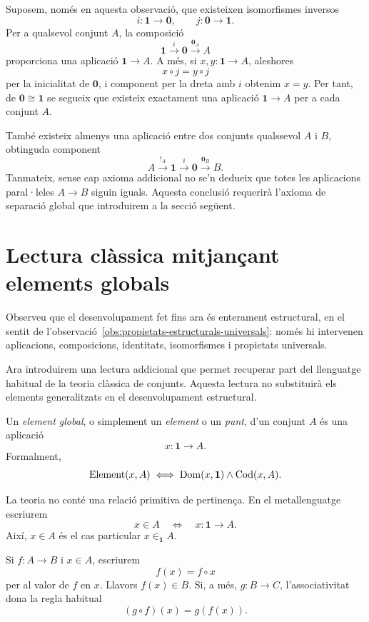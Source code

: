 \begin{observacio}\label{obs:zero-u-sense-separacio}
Suposem, només en aquesta observació, que existeixen isomorfismes inversos
\[
i:\mathbf1\to\mathbf0,
\qquad
j:\mathbf0\to\mathbf1.
\]
Per a qualsevol conjunt \(A\), la composició
\[
\mathbf1\xrightarrow{i}\mathbf0\xrightarrow{\mathbf{0}_A}A
\]
proporciona una aplicació \(\mathbf1\to A\). A més, si \(x,y:\mathbf1\to A\), aleshores
\[
x\circ j=y\circ j
\]
per la inicialitat de \(\mathbf0\), i component per la dreta amb \(i\) obtenim \(x=y\). Per tant, de \(\mathbf0\cong\mathbf1\) se segueix que existeix exactament una aplicació \(\mathbf1\to A\) per a cada conjunt \(A\).

També existeix almenys una aplicació entre dos conjunts qualssevol \(A\) i \(B\), obtinguda component
\[
A\xrightarrow{{!}_A}\mathbf1
\xrightarrow{i}\mathbf0
\xrightarrow{\mathbf{0}_B}B.
\]
Tanmateix, sense cap axioma addicional no se'n dedueix que totes les aplicacions paral·leles \(A\to B\) siguin iguals. Aquesta conclusió requerirà l'axioma de separació global que introduirem a la secció següent.
\end{observacio}

\section{Lectura clàssica mitjançant elements globals}\label{sec:lectura-classica}

Observeu que el desenvolupament fet fins ara és enterament estructural, en el
sentit de l'observació~\ref{obs:propietats-estructurals-universals}:
només hi intervenen aplicacions, composicions, identitats,
isomorfismes i propietats universals.

Ara introduirem una lectura addicional que permet recuperar part
del llenguatge habitual de la teoria clàssica de conjunts.
Aquesta lectura no substituirà els elements generalitzats en el
desenvolupament estructural.

\begin{definicio}\label{def:element-global}
Un \emph{element global}, o simplement un \emph{element} o un \emph{punt}, d'un conjunt \(A\) és una aplicació
\[
x:\mathbf1\to A.
\]
Formalment,
\[
\operatorname{Element}(x,A)
\iff
\operatorname{Dom}(x,\mathbf1)\land\operatorname{Cod}(x,A).
\]
\end{definicio}

\begin{notacio}\label{not:elements-globals}
La teoria no conté una relació primitiva de pertinença. En el metallenguatge escriurem
\[
x\in A
\quad\Longleftrightarrow\quad
x:\mathbf1\to A.
\]
Així, \(x\in A\) és el cas particular \(x\in_{\mathbf1}A\).

Si \(f:A\to B\) i \(x\in A\), escriurem
\[
f(x)=f\circ x
\]
per al valor de \(f\) en \(x\). Llavors \(f(x)\in B\). Si, a més, \(g:B\to C\), l'associativitat dona la regla habitual
\[
(g\circ f)(x)=g(f(x)).
\]
\end{notacio}

